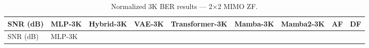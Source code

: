 \documentclass[
  english,
  12pt,
  12pt,
  a4paper,
  oneside]{report}
\begin{document}
\begin{longtable}[]{@{}
  >{\raggedright\arraybackslash}p{}
  >{\raggedright\arraybackslash}p{}
  >{\raggedright\arraybackslash}p{}
  >{\raggedright\arraybackslash}p{}
  >{\raggedright\arraybackslash}p{}
  >{\raggedright\arraybackslash}p{}
  >{\raggedright\arraybackslash}p{}
  >{\raggedright\arraybackslash}p{}
  >{\raggedright\arraybackslash}p{}@{}}
\caption{Normalized 3K BER results --- 2×2 MIMO ZF.}\label{tbl:table10}\tabularnewline
\toprule\noalign{}
\begin{minipage}[b]{\linewidth}\raggedright
SNR (dB)
\end{minipage} & \begin{minipage}[b]{\linewidth}\raggedright
MLP-3K
\end{minipage} & \begin{minipage}[b]{\linewidth}\raggedright
Hybrid-3K
\end{minipage} & \begin{minipage}[b]{\linewidth}\raggedright
VAE-3K
\end{minipage} & \begin{minipage}[b]{\linewidth}\raggedright
Transformer-3K
\end{minipage} & \begin{minipage}[b]{\linewidth}\raggedright
Mamba-3K
\end{minipage} & \begin{minipage}[b]{\linewidth}\raggedright
Mamba2-3K
\end{minipage} & \begin{minipage}[b]{\linewidth}\raggedright
AF
\end{minipage} & \begin{minipage}[b]{\linewidth}\raggedright
DF
\end{minipage} \\
\midrule\noalign{}
\endfirsthead
\toprule\noalign{}
\begin{minipage}[b]{\linewidth}\raggedright
SNR (dB)
\end{minipage} & \begin{minipage}[b]{\linewidth}\raggedright
MLP-3K
\end{minipage} & \begin{minipage}[b]{\linewidth}\raggedright

\end{minipage}
\end{longtable}
\end{document}
